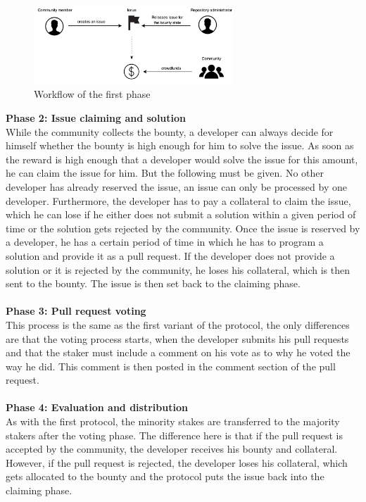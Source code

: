 \documentclass[sigconf]{acmart}
\begin{document}
\begin{figure}[h]
	\centering
	\includegraphics[width=75mm]{images/phase1.png}
	\caption{Workflow of the first phase}
	\label{fig:arch-phase1}
\end{figure} 
\textbf{Phase 2: Issue claiming and solution} \\
While the community collects the bounty, a developer can always decide for himself whether the bounty is high enough for him to 
solve the issue. As soon as the reward is high enough that a developer would solve the issue for this amount, he can claim the
issue for him. But the following must be given. No other developer has already reserved the issue, an issue can only be processed 
by one developer. Furthermore, the developer has to pay a collateral to claim the issue, which he can lose if he either does not submit 
a solution within a given period of time or the solution gets rejected by the community. Once the issue is reserved by a developer, 
he has a certain period of time in which he has to program a solution and provide it as a pull request. If the developer does not 
provide a solution or it is rejected by the community, he loses his collateral, which is then sent to the bounty. The issue is then set back 
to the claiming phase.\\ \\
\textbf{Phase 3: Pull request voting} \\
This process is the same as the first variant of the protocol, the only differences are that the voting process starts, when 
the developer submits his pull requests and that the staker must include a comment on his 
vote as to why he voted the way he did. This comment is then posted in the comment section of the pull request. \\ \\
\textbf{Phase 4: Evaluation and distribution} \\
As with the first protocol, the minority stakes are transferred to the majority stakers after the voting phase. The difference 
here is that if the pull request is accepted by the community, the developer receives his bounty and collateral. However, 
if the pull request is rejected, the developer loses his collateral, which gets allocated to the bounty and the protocol puts the issue 
back into the claiming phase.
\end{document}
